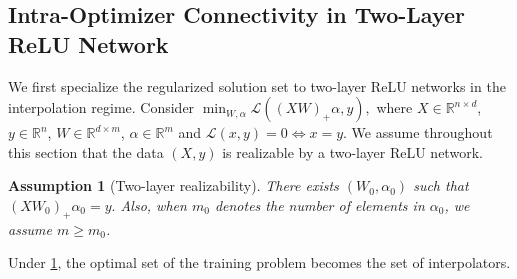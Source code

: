 \documentclass{article}
\newtheorem{assumption}{Assumption}[section]
\begin{document}






\subsection{Intra-Optimizer Connectivity in Two-Layer ReLU Network}
\label{sec:intra-mode connectivity}

We first specialize the regularized solution set to two-layer ReLU networks in the
interpolation regime. Consider
$
\min_{W,\alpha} \mathcal L((XW)_+\alpha,y),
$
where \(X\in\mathbb R^{n\times d}\), \(y\in\mathbb R^n\),
\(W\in\mathbb R^{d\times m}\), \(\alpha\in\mathbb R^m\) and $\mathcal{L}(x,y) = 0 \Leftrightarrow x = y$.
We assume throughout this section that the data $(X,y)$ is realizable by a two-layer ReLU network.

\begin{assumption}[Two-layer realizability]
\label{assump:realizability}
There exists \((W_0,\alpha_0)\) such that $(XW_0)_+\alpha_0 = y.$ Also, when $m_0$ denotes the number of elements in $\alpha_0$, we assume $m \geq m_0$.
\end{assumption}
Under \cref{assump:realizability}, the optimal set of the training problem becomes the set of interpolators.  
\end{document}
